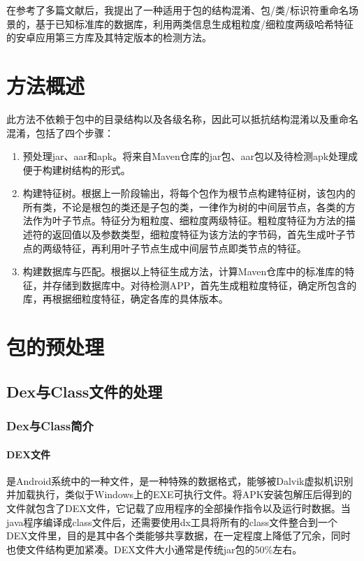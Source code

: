 在参考了多篇文献后，我提出了一种适用于包的结构混淆、包/类/标识符重命名场景的，基于已知标准库的数据库，利用两类信息生成粗粒度/细粒度两级哈希特征的安卓应用第三方库及其特定版本的检测方法。



\section{方法概述}

此方法不依赖于包中的目录结构以及各级名称，因此可以抵抗结构混淆以及重命名混淆，包括了四个步骤：
\begin{enumerate}
\item{预处理jar、aar和apk。将来自Maven仓库的jar包、aar包以及待检测apk处理成便于构建树结构的形式。}
\item{构建特征树。根据上一阶段输出，将每个包作为根节点构建特征树，该包内的所有类，不论是根包的类还是子包的类，一律作为树的中间层节点，各类的方法作为叶子节点。特征分为粗粒度、细粒度两级特征。粗粒度特征为方法的描述符的返回值以及参数类型，细粒度特征为该方法的字节码，首先生成叶子节点的两级特征，再利用叶子节点生成中间层节点即类节点的特征。}
\item{构建数据库与匹配。根据以上特征生成方法，计算Maven仓库中的标准库的特征，并存储到数据库中。对待检测APP，首先生成粗粒度特征，确定所包含的库，再根据细粒度特征，确定各库的具体版本。}
\end{enumerate}



\section{包的预处理}

\subsection{Dex与Class文件的处理}

\subsubsection{Dex与Class简介}

\paragraph{DEX文件}是Android系统中的一种文件，是一种特殊的数据格式，能够被Dalvik虚拟机识别并加载执行，类似于Windows上的EXE可执行文件。将APK安装包解压后得到的文件就包含了DEX文件，它记载了应用程序的全部操作指令以及运行时数据。当java程序编译成class文件后，还需要使用dx工具将所有的class文件整合到一个DEX文件里，目的是其中各个类能够共享数据，在一定程度上降低了冗余，同时也使文件结构更加紧凑。DEX文件大小通常是传统jar包的50\%左右。


